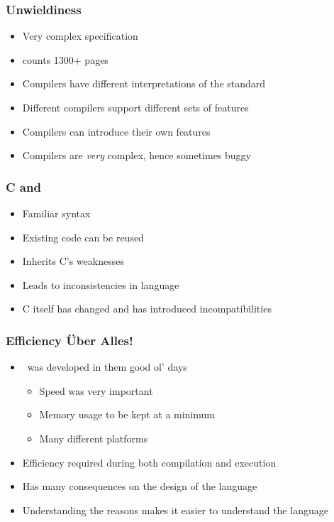 \begin{frame}
  \frametitle{Unwieldiness}
  \begin{itemize}
    \item Very complex specification
    \item {}
          counts 1300+ pages 
    \item Compilers have different interpretations of the standard
    \item Different compilers support different sets of features
    \item Compilers can introduce their own features
    \item Compilers are \emph{very} complex, hence sometimes buggy
  \end{itemize}
\end{frame}

\begin{frame}
  \frametitle{C and \cpp}
  \begin{itemize}
    \item Familiar syntax
    \item Existing code can be reused
  \end{itemize}
  \vskip5mm
  \begin{itemize}
    \item Inherits C's weaknesses
    \item Leads to inconsistencies in language
  \end{itemize}
  \vskip5mm
  \begin{itemize}
    \item C itself has changed and has introduced incompatibilities
  \end{itemize}
\end{frame}

\begin{frame}
  \frametitle{Efficiency \"Uber Alles!}
  \begin{itemize}
    \item \cpp\ was developed in them good ol' days
          \begin{itemize}
            \item Speed was very important
            \item Memory usage to be kept at a minimum
            \item Many different platforms
          \end{itemize}
    \item Efficiency required during both compilation and execution
    \item Has many consequences on the design of the language
    \item Understanding the reasons makes it easier to understand the language
  \end{itemize}
\end{frame}

